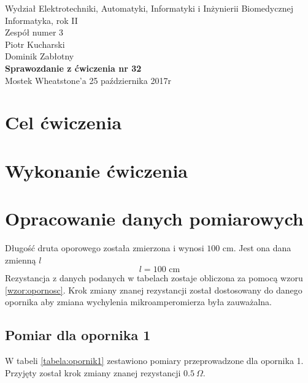 \documentclass[a4paper,12pts]{article}
\begin{document}
	\thispagestyle{empty}
	\begin{flushleft}
		Wydział Elektrotechniki, Automatyki, Informatyki i Inżynierii Biomedycznej \\
		Informatyka, rok II \\
		Zespół numer 3 \\
		Piotr Kucharski \\
		Dominik Zabłotny \\
		\vspace*{\fill}
		{\large \textbf{Sprawozdanie z ćwiczenia nr 32} } \\
		Mostek Wheatstone'a		
		\vfill	
		25 października 2017r
	\end{flushleft}
	
	\newpage
	
	
	\section{Cel ćwiczenia}
	
	
	\section{Wykonanie ćwiczenia}
	
	
	\section{Opracowanie danych pomiarowych}
	Długość druta oporowego została zmierzona i wynosi $100$ cm. Jest ona dana zmienną $l$
	\begin{equation}
		l = 100 \textrm{ cm}
	\end{equation}
	Rezystancja z danych podanych w tabelach zostaje obliczona za pomocą wzoru \ref{wzor:opornosc}. Krok zmiany znanej rezystancji został dostosowany do danego opornika aby zmiana wychylenia mikroamperomierza była zauważalna.
	
	\subsection{Pomiar dla opornika 1}
	W tabeli \ref{tabela:opornik1} zestawiono pomiary przeprowadzone dla opornika 1. Przyjęty został krok zmiany znanej rezystancji $0.5 ~\Omega$.
	
\end{document}
